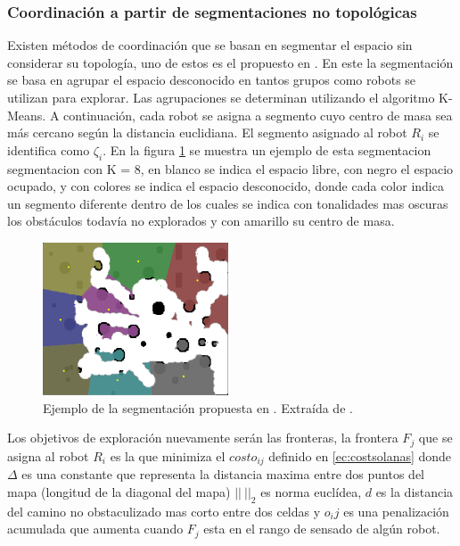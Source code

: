 \subsubsection{Coordinación a partir de segmentaciones no topológicas}\label{subsec:coordNoTop}
Existen métodos de coordinación que se basan en segmentar el espacio sin considerar su topología, uno de estos es el propuesto en \cite{Solanas2004}. En este la segmentación se basa en agrupar el espacio desconocido en tantos grupos como robots se utilizan para explorar. Las agrupaciones se determinan utilizando el algoritmo K-Means\cite{hartigan1979ak}. A continuación, cada robot se asigna a segmento cuyo centro de masa sea más cercano según la distancia euclidiana. El segmento asignado al robot $R_i$ se identifica como $\zeta_i$. En la figura \ref{fig:ejemploCoodGrill} se muestra un ejemplo de esta segmentacion segmentacion con K = 8, en blanco se indica el espacio libre, con negro el espacio ocupado, y con colores se indica el espacio desconocido, donde cada color indica un segmento diferente dentro de los cuales se indica con tonalidades mas oscuras los obstáculos todavía no explorados y con amarillo su centro de masa.
\begin{figure}[H]
  \center
  \includegraphics[width=5.5cm]{imagenes/coordGrillCM.png}
  \caption{Ejemplo de la segmentación propuesta en \cite{Solanas2004}. Extraída de \cite{wu2007voronoi}.}\label{fig:ejemploCoodGrill}
\end{figure} 

Los objetivos de exploración nuevamente serán las fronteras, la frontera $F_j$ que se asigna al robot $R_i$ es la que minimiza el $costo_{ij}$ definido en \eqref{ec:costsolanas} donde $\Delta$ es una constante que representa la distancia maxima entre dos puntos del mapa (longitud de la diagonal del mapa) $||\ ||_2$ es norma euclídea, $d$ es la distancia del camino no obstaculizado mas corto entre dos celdas y $o_ij$ es una penalización acumulada que aumenta cuando $F_j$ esta en el rango de sensado de algún robot.

